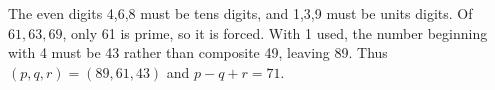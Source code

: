The even digits 4,6,8 must be tens digits, and 1,3,9 must be units digits. Of $61,63,69$, only 61 is prime, so it is forced. With 1 used, the number beginning with 4 must be 43 rather than composite 49, leaving 89. Thus $(p,q,r)=(89,61,43)$ and $p-q+r=\boxed{71}$.
